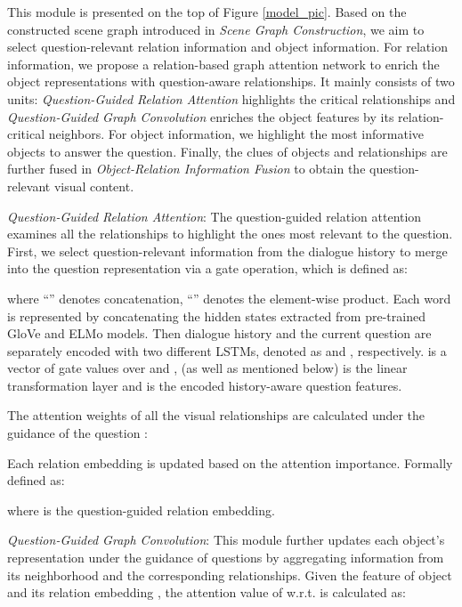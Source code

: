 \documentclass[letterpaper]{article} \usepackage{aaai20}  \usepackage{times}  \usepackage{helvet} \usepackage{courier}  \usepackage[hyphens]{url}  \usepackage{graphicx} \urlstyle{rm} \def\UrlFont{\rm}  \usepackage{graphicx}  \frenchspacing  \setlength{\pdfpagewidth}{8.5in}  \setlength{\pdfpageheight}{11in}  \usepackage{mathrsfs} \usepackage{amsfonts,amssymb}  \usepackage{tabularx} \usepackage{url}
\begin{document}
This module is presented on the top of Figure \ref{model_pic}. Based on the constructed scene graph introduced in \textit{Scene Graph Construction}, we aim to select question-relevant relation information and object information. For relation information, we propose a relation-based graph attention network to enrich the object representations with question-aware relationships. It mainly consists of two units: \textit{Question-Guided Relation Attention} highlights the critical relationships and \textit{Question-Guided Graph Convolution} enriches the object features by its relation-critical neighbors. 
For object information, we highlight the most informative objects to answer the question. Finally, the clues of objects and relationships are further fused in \textit{Object-Relation Information Fusion} to obtain the question-relevant visual content. 

\textit{Question-Guided Relation Attention}: The question-guided relation attention examines all the relationships to highlight the ones most relevant to the question. First, we select question-relevant information from the dialogue history to merge into the question representation via a gate operation, which is defined as:



where ``'' denotes concatenation, ``'' denotes the element-wise product. Each word is represented by concatenating the hidden states extracted from pre-trained GloVe and ELMo models. Then dialogue history  and the current question  are separately encoded with two different LSTMs, denoted as  and , respectively.  is a vector of  gate values over  and ,  (as well as  mentioned below) is the linear transformation layer and  is the encoded history-aware question features.

The attention weights  of all the visual relationships are calculated under the guidance of the question :


Each relation embedding is updated based on the attention importance. Formally defined  as:

where  is the question-guided relation embedding.

\textit{Question-Guided Graph Convolution}: This module further updates each object's representation under the guidance of questions by aggregating information from its neighborhood and the corresponding relationships. Given the feature  of object  and its relation embedding , the attention value of  w.r.t.  is calculated as:
\end{document}
